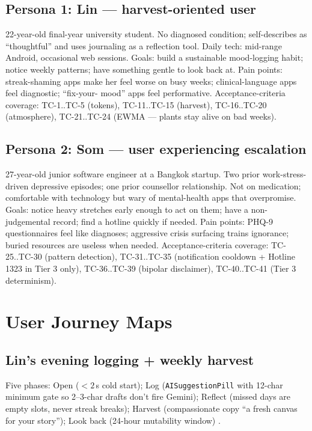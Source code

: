 \documentclass[11pt,a4paper]{article}
\begin{document}
\subsection{Persona 1: Lin --- harvest-oriented user}

22-year-old final-year university student. No diagnosed condition;
self-describes as ``thoughtful'' and uses journaling as a reflection tool.
Daily tech: mid-range Android, occasional web sessions. Goals: build a
sustainable mood-logging habit; notice weekly patterns; have something
gentle to look back at. Pain points: streak-shaming apps make her feel
worse on busy weeks; clinical-language apps feel diagnostic; ``fix-your-
mood'' apps feel performative. Acceptance-criteria coverage: TC-1..TC-5
(tokens), TC-11..TC-15 (harvest), TC-16..TC-20 (atmosphere),
TC-21..TC-24 (EWMA --- plants stay alive on bad weeks).

\subsection{Persona 2: Som --- user experiencing escalation}

27-year-old junior software engineer at a Bangkok startup. Two prior
work-stress-driven depressive episodes; one prior counsellor relationship.
Not on medication; comfortable with technology but wary of mental-health
apps that overpromise. Goals: notice heavy stretches early enough to act
on them; have a non-judgemental record; find a hotline quickly if needed.
Pain points: PHQ-9 questionnaires feel like diagnoses; aggressive crisis
surfacing trains ignorance; buried resources are useless when needed.
Acceptance-criteria coverage: TC-25..TC-30 (pattern detection),
TC-31..TC-35 (notification cooldown + Hotline 1323 in Tier 3 only),
TC-36..TC-39 (bipolar disclaimer), TC-40..TC-41 (Tier 3 determinism).

\section{User Journey Maps}

\subsection{Lin's evening logging + weekly harvest}

Five phases: Open ($<2$\,s cold start); Log (\texttt{AISuggestionPill} with
12-char minimum gate so 2--3-char drafts don't fire Gemini); Reflect
(missed days are empty slots, never streak breaks); Harvest (compassionate
copy ``a fresh canvas for your story''); Look back (24-hour mutability
window) \autocite{pennebaker1997expressive,locke2002goals}.
\end{document}
